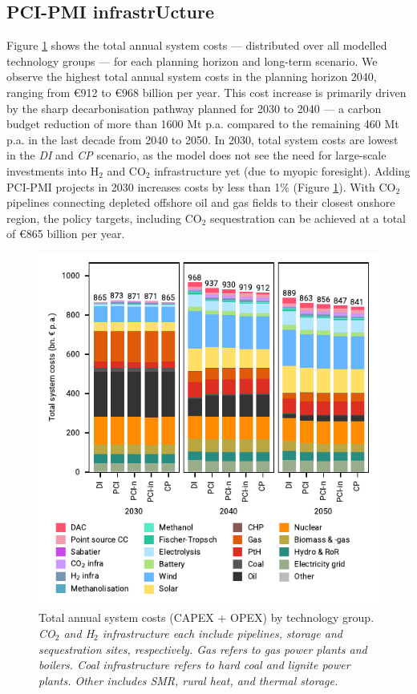 \documentclass[pdflatex,sn-nature]{sn-jnl}
\theoremstyle{thmstyleone}%
\theoremstyle{thmstyletwo}%
\theoremstyle{thmstylethree}%
\begin{document}
\subsection{PCI-PMI infrastrUcture}
Figure \ref{fig:costs_overview} shows the total annual system costs --- distributed over all modelled technology groups --- for each planning horizon and long-term scenario. We observe the highest total annual system costs in the planning horizon 2040, ranging from €912 to €968 billion per year. This cost increase is primarily driven by the sharp decarbonisation pathway planned for 2030 to 2040 --- a carbon budget reduction of more than 1600 Mt p.a. compared to the remaining 460 Mt p.a. in the last decade from 2040 to 2050. In 2030, total system costs are lowest in the \textit{DI} and \textit{CP} scenario, as the model does not see the need for large-scale investments into H$_2$ and CO$_2$ infrastructure yet (due to myopic foresight). Adding PCI-PMI projects in 2030 increases costs by less than 1\% (Figure \ref{fig:costs_overview}). With CO$_2$ pipelines connecting depleted offshore oil and gas fields to their closest onshore region, the policy targets, including CO$_2$ sequestration can be achieved at a total of €865 billion per year.

\begin{figure}[htbp]
  \centering
  \includegraphics{figures/costs_overview}
  \caption{Total annual system costs (CAPEX + OPEX) by technology group. \textit{CO$_2$ and H$_2$ infrastructure each include pipelines, storage and sequestration sites, respectively. Gas refers to gas power plants and boilers. Coal infrastructure refers to hard coal and lignite power plants. Other includes SMR, rural heat, and thermal storage.}}
  \label{fig:costs_overview}
\end{figure}
\end{document}

